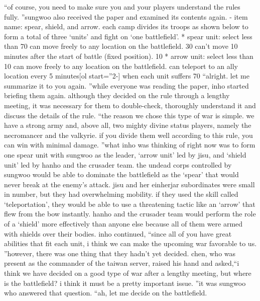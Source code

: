 “of course, you need to make sure you and your players understand the rules fully.
”sungwoo also received the paper and examined its contents again.
- item name: spear, shield, and arrow.
 each camp divides its troops as shown below to form a total of three ‘units’ and fight on ‘one battlefield’.
* spear unit: select less than 70%
 can move freely to any location on the battlefield.
 30%
 can’t move 10 minutes after the start of battle (fixed position).
 10%
* arrow unit: select less than 10%
 can move freely to any location on the battlefield.
 can teleport to an ally location every 5 minutes[ol start=”2-]
when each unit suffers 70%
“alright.
 let me summarize it to you again.
”while everyone was reading the paper, inho started briefing them again.
although they decided on the rule through a lengthy meeting, it was necessary for them to double-check, thoroughly understand it and discuss the details of the rule.
“the reason we chose this type of war is simple.
 we have a strong army and, above all, two mighty divine status players, namely the necromancer and the valkyrie.
 if you divide them well according to this rule, you can win with minimal damage.
”what inho was thinking of right now was to form one spear unit with sungwoo as the leader, ‘arrow unit’ led by jisu, and ‘shield unit’ led by hanho and the crusader team.
the undead corps controlled by sungwoo would be able to dominate the battlefield as the ‘spear’ that would never break at the enemy’s attack.
jisu and her einherjar subordinates were small in number, but they had overwhelming mobility.
 if they used the skill called ‘teleportation’, they would be able to use a threatening tactic like an ‘arrow’ that flew from the bow instantly.
hanho and the crusader team would perform the role of a ‘shield’ more effectively than anyone else because all of them were armed with shields over their bodies.
inho continued, “since all of you have great abilities that fit each unit, i think we can make the upcoming war favorable to us.
”however, there was one thing that they hadn’t yet decided.
chen, who was present as the commander of the taiwan server, raised his hand and asked,“i think we have decided on a good type of war after a lengthy meeting, but where is the battlefield? i think it must be a pretty important issue.
”it was sungwoo who answered that question.
“ah, let me decide on the battlefield.
